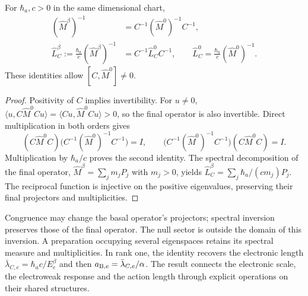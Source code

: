 \begin{proposition}
For $\hbar_a,c>0$ in the same dimensional chart,
\begin{equation}
 \begin{aligned}
 (\widehat M^\beta)^{-1}
    &=C^{-1}(\widehat M^0)^{-1}C^{-1},\\
 \widehat L_C^\beta:=\frac{\hbar_a}{c}(\widehat M^\beta)^{-1}
    &=C^{-1}\widehat L_C^0C^{-1},\qquad
 \widehat L_C^0=\frac{\hbar_a}{c}(\widehat M^0)^{-1}.
 \end{aligned}
 \label{amp-ew-inversa-operador}
\end{equation}
These identities allow $[C,\widehat M^0]\ne0$.
\end{proposition}
\begin{proof}
Positivity of $C$ implies invertibility. For $u\ne0$,
$\langle u,C\widehat M^0Cu\rangle
=\langle Cu,\widehat M^0Cu\rangle>0$, so the final operator is
also invertible. Direct multiplication in both orders gives
\[
 (C\widehat M^0C)\bigl(C^{-1}(\widehat M^0)^{-1}C^{-1}\bigr)=I,
 \qquad
 \bigl(C^{-1}(\widehat M^0)^{-1}C^{-1}\bigr)(C\widehat M^0C)=I.
\]
Multiplication by $\hbar_a/c$ proves the second identity. The spectral
decomposition of the final operator,
$\widehat M^\beta=\sum_jm_jP_j$ with $m_j>0$, yields
$\widehat L_C^\beta=\sum_j\hbar_a/(cm_j)P_j$. The reciprocal function
is injective on the positive eigenvalues, preserving their final
projectors and multiplicities.
\end{proof}

Congruence may change the basal operator's projectors; spectral
inversion preserves those of the final operator. The null sector is
outside the domain of this inversion. A preparation occupying several
eigenspaces retains its spectral measure and multiplicities.
In rank one, the identity recovers the electronic length
$\bar\lambda_{C,e}=\hbar_ac/E_e^\beta$ and then
$a_{{\rm B},e}=\bar\lambda_{C,e}/\alpha$. The result connects the
electronic scale, the electroweak response and the action length through
explicit operations on their shared structures.
